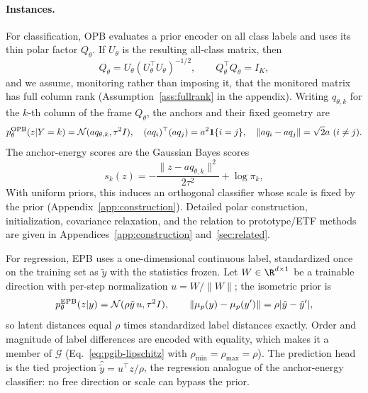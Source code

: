 \paragraph{Instances.}\label{sec:opb}
For classification, OPB evaluates a prior encoder on all class labels and uses its
thin polar factor $Q_\theta$. If $U_\theta$ is the resulting all-class matrix, then
\begin{equation}
Q_\theta=U_\theta(U_\theta^\top U_\theta)^{-1/2},
\qquad Q_\theta^\top Q_\theta=I_K,
\label{eq:opb-qr}
\end{equation}
and we assume, monitoring rather than imposing it, that the monitored matrix has
full column rank (Assumption~\ref{ass:fullrank} in the appendix). Writing
$q_{\theta,k}$ for the $k$-th column of the frame $Q_\theta$, the anchors and their
fixed geometry are
\begin{equation}
p_\theta^{\rm OPB}(z|Y=k)=\mathcal N(aq_{\theta,k},\tau^2I),\quad
(aq_i)^\top(aq_j)=a^2\mathbf 1\{i=j\},
\quad \|aq_i-aq_j\|=\sqrt2a\ (i\ne j).
\label{eq:opb-prior}
\end{equation}
The anchor-energy scores are the Gaussian Bayes scores
\begin{equation}
s_k(z)=-\frac{\|z-aq_{\theta,k}\|^2}{2\tau^2}+\log\pi_k,
\label{eq:opb-energy}
\end{equation}
With uniform priors, this induces an orthogonal classifier whose scale is fixed by
the prior (Appendix~\ref{app:construction}). Detailed polar
construction, initialization, covariance relaxation, and the relation to
prototype/ETF methods are given in Appendices~\ref{app:construction} and~\ref{sec:related}.

For regression, EPB uses a one-dimensional continuous label, standardized once on
the training set as $\tilde y$ with the statistics frozen. Let $W\in\R^{d\times1}$ be
a trainable direction with per-step normalization $u=W/\|W\|$; the isometric prior is
\begin{equation}
p_\theta^{\rm EPB}(z|y)=\mathcal N(\rho\tilde y\,u,\tau^2I),\qquad
\|\mu_p(y)-\mu_p(y')\|=\rho|\tilde y-\tilde y'|,
\label{eq:epb-prior}
\end{equation}
so latent distances equal $\rho$ times standardized label distances exactly. Order
and magnitude of label differences are encoded with equality, which makes it a
member of $\mathcal G$ (Eq.~\eqref{eq:pgib-lipschitz} with
$\rho_{\min}=\rho_{\max}=\rho$). The
prediction head is the tied projection $\hat{\tilde y}=u^\top z/\rho$, the regression
analogue of the anchor-energy classifier: no free direction or scale can bypass the
prior.

